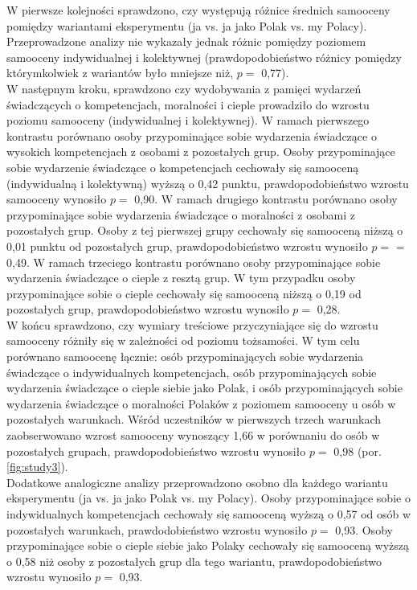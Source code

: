\documentclass[man]{apa6}
\begin{document}
W pierwsze kolejności sprawdzono, czy występują różnice średnich samooceny pomiędzy wariantami eksperymentu (ja vs. ja jako Polak vs. my Polacy). Przeprowadzone analizy nie wykazały jednak różnic pomiędzy poziomem samooceny indywidualnej i kolektywnej (prawdopodobieństwo różnicy pomiędzy którymkolwiek z wariantów było mniejsze niż, $p =$ 0,77). \\

W następnym kroku, sprawdzono czy wydobywania z pamięci wydarzeń świadczących o kompetencjach, moralności i cieple prowadziło do wzrostu poziomu samooceny (indywidualnej i kolektywnej). W ramach pierwszego kontrastu porównano osoby przypominające sobie wydarzenia świadczące o wysokich kompetencjach z osobami z pozostałych grup. Osoby przypominające sobie wydarzenie świadczące o kompetencjach cechowały się samooceną (indywidualną i kolektywną) wyższą o 0,42 punktu, prawdopodobieństwo wzrostu samooceny wynosiło $p =$ 0,90. W ramach drugiego kontrastu porównano osoby przypominające sobie wydarzenia świadczące o moralności z osobami z pozostałych grup. Osoby z tej pierwszej grupy cechowały się samooceną niższą o 0,01 punktu od pozostałych grup, prawdopodobieństwo wzrostu wynosiło $p =$ = 0,49. W ramach trzeciego kontrastu porównano osoby przypominające sobie wydarzenia świadczące o cieple z resztą grup. W tym przypadku osoby przypominające sobie o cieple cechowały się samooceną niższą o 0,19 od pozostałych grup, prawdopodobieństwo wzrostu wynosiło $p =$ 0,28. \\

W końcu sprawdzono, czy wymiary treściowe przyczyniające się do wzrostu samooceny różniły się w zależności od poziomu tożsamości. W tym celu porównano samoocenę łącznie: osób przypominających sobie wydarzenia świadczące o indywidualnych kompetencjach, osób przypominających sobie wydarzenia świadczące o cieple siebie jako Polak, i osób przypominających sobie wydarzenia świadczące o moralności Polaków z poziomem samooceny u osób w pozostałych warunkach. Wśród uczestników w pierwszych trzech warunkach zaobserwowano wzrost samooceny wynoszący 1,66 w porównaniu do osób w pozostałych grupach, prawdopodobieństwo wzrostu wynosiło $p =$ 0,98 (por. \ref{fig:study3}).\\

Dodatkowe analogiczne analizy przeprowadzono osobno dla każdego wariantu eksperymentu (ja vs. ja jako Polak vs. my Polacy). Osoby przypominające sobie o indywidualnych kompetencjach cechowały się samooceną wyższą o 0,57 od osób w pozostałych warunkach, prawdodobieństwo wzrostu wynosiło $p =$ 0,93. Osoby przypominające sobie o cieple siebie jako Polaky cechowały się samooceną wyższą o 0,58 niż osoby z pozostałych grup dla tego wariantu, prawdopodobieństwo wzrostu wynosiło $p =$ 0,93.
\end{document}
